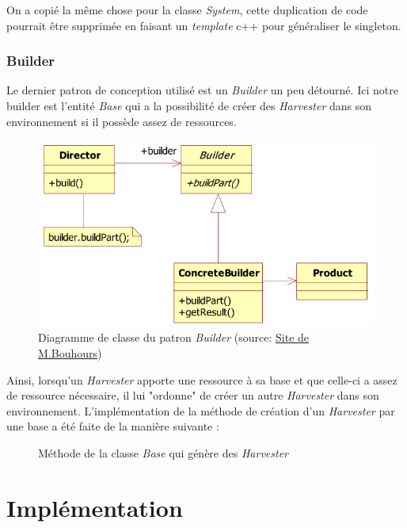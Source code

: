 \documentclass{article}
\begin{document}
On a copié la même chose pour la classe \emph{System}, cette duplication de code pourrait
être supprimée en faisant un \emph{template} c++ pour généraliser le singleton.

\subsubsection{Builder}
Le dernier patron de conception utilisé est un \emph{Builder} un peu détourné. Ici notre builder est l'entité \emph{Base} qui
a la possibilité de créer des \emph{Harvester} dans son environnement si il possède assez de ressources.

\begin{figure}[!h]
  \centering
  \caption{Diagramme de classe du patron \emph{Builder} (source: \href{http://www.goprod.bouhours.net/?page=pattern&pat_id=4}{Site de M.Bouhours})}
  \includegraphics[scale=0.6]{img/builder.png}
\end{figure}

Ainsi, lorsqu'un \emph{Harvester} apporte une ressource à sa base et que celle-ci a assez de ressource nécessaire, il lui "ordonne" de
créer un autre \emph{Harvester} dans son environnement. L'implémentation de la méthode de création d'un \emph{Harvester} par une base
a été faite de la manière suivante :
\begin{figure}[!h]
  \centering
  \caption{Méthode de la classe \emph{Base} qui génère des \emph{Harvester}}
  
\end{figure}



\newpage
\section{Implémentation}
\end{document}
